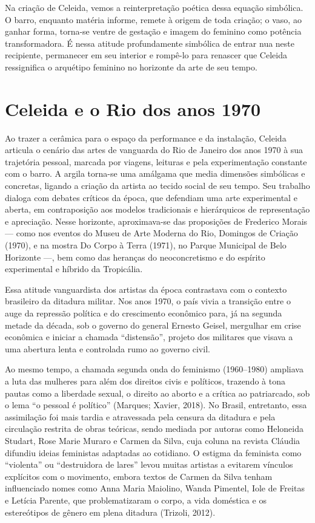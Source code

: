 Na criação de Celeida, vemos a reinterpretação poética dessa equação simbólica. O barro, enquanto matéria informe, remete à origem de toda criação; o vaso, ao ganhar forma, torna-se ventre de gestação e imagem do feminino como potência transformadora. É nessa atitude profundamente simbólica de entrar nua neste recipiente, permanecer em seu interior e rompê-lo para renascer que Celeida ressignifica o arquétipo feminino no horizonte da arte de seu tempo.

\section*{Celeida e o Rio dos anos 1970}
Ao trazer a cerâmica para o espaço da performance e da instalação, Celeida articula o cenário das artes de vanguarda do Rio de Janeiro dos anos 1970 à sua trajetória pessoal, marcada por viagens, leituras e pela experimentação constante com o barro. A argila torna-se uma amálgama que media dimensões simbólicas e concretas, ligando a criação da artista ao tecido social de seu tempo.
Seu trabalho dialoga com debates críticos da época, que defendiam uma arte experimental e aberta, em contraposição aos modelos tradicionais e hierárquicos de representação e apreciação. Nesse horizonte, aproximava-se das proposições de Frederico Morais — como nos eventos do Museu de Arte Moderna do Rio, Domingos de Criação (1970), e na mostra Do Corpo à Terra (1971), no Parque Municipal de Belo Horizonte —, bem como das heranças do neoconcretismo e do espírito experimental e híbrido da Tropicália.

Essa atitude vanguardista dos artistas da época contrastava com o contexto brasileiro da ditadura militar. Nos anos 1970, o país vivia a transição entre o auge da repressão política e do crescimento econômico para, já na segunda metade da década, sob o governo do general Ernesto Geisel, mergulhar em crise econômica e iniciar a chamada “distensão”, projeto dos militares que visava a uma abertura lenta e controlada rumo ao governo civil.

Ao mesmo tempo, a chamada segunda onda do feminismo (1960–1980) ampliava a luta das mulheres para além dos direitos civis e políticos, trazendo à tona pautas como a liberdade sexual, o direito ao aborto e a crítica ao patriarcado, sob o lema “o pessoal é político” (Marques; Xavier, 2018). No Brasil, entretanto, essa assimilação foi mais tardia e atravessada pela censura da ditadura e pela circulação restrita de obras teóricas, sendo mediada por autoras como Heloneida Studart, Rose Marie Muraro e Carmen da Silva, cuja coluna na revista Cláudia difundiu ideias feministas adaptadas ao cotidiano. O estigma da feminista como “violenta” ou “destruidora de lares” levou muitas artistas a evitarem vínculos explícitos com o movimento, embora textos de Carmen da Silva tenham influenciado nomes como Anna Maria Maiolino, Wanda Pimentel, Iole de Freitas e Letícia Parente, que problematizaram o corpo, a vida doméstica e os estereótipos de gênero em plena ditadura (Trizoli, 2012).

